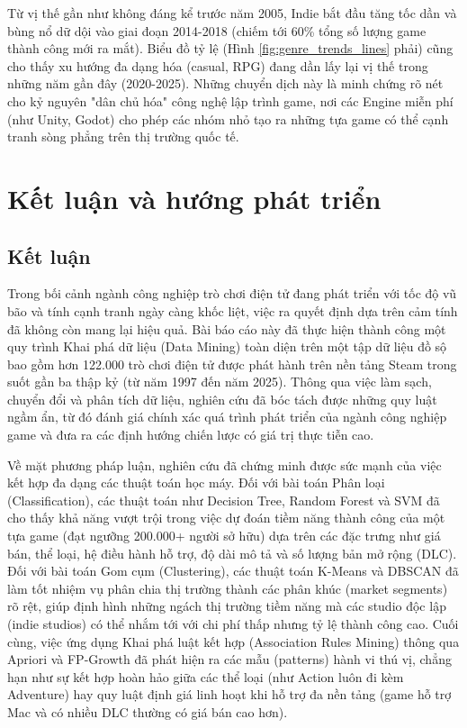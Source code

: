 \hspace{1cm} Từ vị thế gần như không đáng kể trước năm 2005, Indie bắt đầu tăng tốc dần và bùng nổ dữ dội vào giai đoạn 2014-2018 (chiếm tới 60\% tổng số lượng game thành công mới ra mắt). Biểu đồ tỷ lệ (Hình \ref{fig:genre_trends_lines} phải) cũng cho thấy xu hướng đa dạng hóa (casual, RPG) đang dần lấy lại vị thế trong những năm gần đây (2020-2025). Những chuyển dịch này là minh chứng rõ nét cho kỷ nguyên "dân chủ hóa" công nghệ lập trình game, nơi các Engine miễn phí (như Unity, Godot) cho phép các nhóm nhỏ tạo ra những tựa game có thể cạnh tranh sòng phẳng trên thị trường quốc tế.






\newpage
\section{Kết luận và hướng phát triển}

\subsection{Kết luận}
\hspace{1cm} Trong bối cảnh ngành công nghiệp trò chơi điện tử đang phát triển với tốc độ vũ bão và tính cạnh tranh ngày càng khốc liệt, việc ra quyết định dựa trên cảm tính đã không còn mang lại hiệu quả. Bài báo cáo này đã thực hiện thành công một quy trình Khai phá dữ liệu (Data Mining) toàn diện trên một tập dữ liệu đồ sộ bao gồm hơn 122.000 trò chơi điện tử được phát hành trên nền tảng Steam trong suốt gần ba thập kỷ (từ năm 1997 đến năm 2025). Thông qua việc làm sạch, chuyển đổi và phân tích dữ liệu, nghiên cứu đã bóc tách được những quy luật ngầm ẩn, từ đó đánh giá chính xác quá trình phát triển của ngành công nghiệp game và đưa ra các định hướng chiến lược có giá trị thực tiễn cao.

\hspace{1cm} Về mặt phương pháp luận, nghiên cứu đã chứng minh được sức mạnh của việc kết hợp đa dạng các thuật toán học máy. Đối với bài toán Phân loại (Classification), các thuật toán như Decision Tree, Random Forest và SVM đã cho thấy khả năng vượt trội trong việc dự đoán tiềm năng thành công của một tựa game (đạt ngưỡng 200.000+ người sở hữu) dựa trên các đặc trưng như giá bán, thể loại, hệ điều hành hỗ trợ, độ dài mô tả và số lượng bản mở rộng (DLC). Đối với bài toán Gom cụm (Clustering), các thuật toán K-Means và DBSCAN đã làm tốt nhiệm vụ phân chia thị trường thành các phân khúc (market segments) rõ rệt, giúp định hình những ngách thị trường tiềm năng mà các studio độc lập (indie studios) có thể nhắm tới với chi phí thấp nhưng tỷ lệ thành công cao. Cuối cùng, việc ứng dụng Khai phá luật kết hợp (Association Rules Mining) thông qua Apriori và FP-Growth đã phát hiện ra các mẫu (patterns) hành vi thú vị, chẳng hạn như sự kết hợp hoàn hảo giữa các thể loại (như Action luôn đi kèm Adventure) hay quy luật định giá linh hoạt khi hỗ trợ đa nền tảng (game hỗ trợ Mac và có nhiều DLC thường có giá bán cao hơn).

